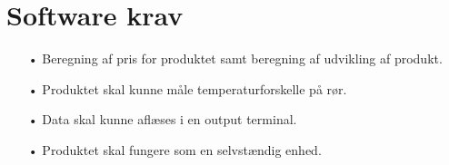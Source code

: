 \section{Software krav}
\begin{enumerate}
	\item[•]Beregning af pris for produktet samt beregning af udvikling af       produkt.
	\item[•]Produktet skal kunne måle temperaturforskelle på rør.
	\item[•]Data skal kunne aflæses i en output terminal.
	\item[•]Produktet skal fungere som en selvstændig enhed.
\end{enumerate}
